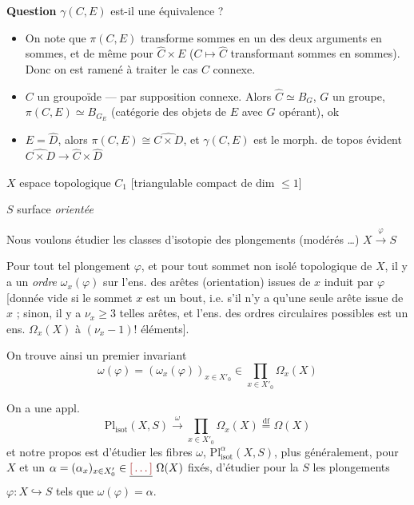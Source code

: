 \documentclass[11pt,a4paper]{article}
\begin{document}
\textbf{Question} $\gamma(C, E)$ est-il  une équivalence ?

\begin{itemize}
  \item[a)]   On note que $\pi(C, E)$
  transforme sommes en un des deux arguments en sommes, et de même pour
  $\hat{C} \times E$ ($C \mapsto \hat{C}$ transformant sommes en sommes).
  Donc on est ramené à traiter le cas $C$ connexe.
  \item[b)] $C$ un groupoïde ---  par supposition connexe.
  Alors $\hat{C} \simeq B_G$, $G$ un groupe, $\pi(C, E) \simeq B_{G_E}$
  (catégorie des objets de $E$ avec $G$ opérant), ok
  \item[c)] $E = \hat{D}$, alors $\pi(C, E) \cong \widehat{C \times D}$, et
  $\gamma(C, E)$ est le morph. de topos  évident
  $\widehat{C \times D} \to \hat{C} \times \hat{D}$
\end{itemize}


$X$ espace topologique  $C_1$ [triangulable compact de
dim $\leq 1$]

$S$ surface \emph{orientée}

Nous voulons étudier les classes d'isotopie des plongements (modérés …)
$X \xrightarrow{\varphi} S$

Pour tout tel plongement $\varphi$, et pour tout sommet 
non isolé topologique de $X$, il y a un \emph{ordre}
 $\omega_x(\varphi)$ sur l'ens. des arêtes
(orientation) issues de $x$ induit par $\varphi$  [donnée vide si
le sommet $x$ est un bout, i.e. s'il n'y a qu'une seule arête issue de $x$ ;
sinon, il y \struck{\ill{}} a $\nu_x \geq 3$ telles arêtes, et \struck{\ill{}}
l'ens. des ordres circulaires possibles est un ens.
$\Omega_x(X)$ à $(\nu_x - 1)!$ éléments].

On trouve ainsi un premier invariant
\[
\omega(\varphi) = (\omega_x(\varphi))_{x \in X'_0} \in \prod_{x \in X'_0} \Omega_x(X)
\]

On a une appl.
\[
\mathrm{Pl}_{\mathrm{isot}}(X, S) \xrightarrow{\ \omega\ } \prod_{x \in X'_0} \Omega_x(X)
\overset{\mathrm{df}}{=} \Omega(X)
\]
et notre propos est d'étudier les fibres  $\omega$,
$\mathrm{Pl}^{\alpha}_{\mathrm{isot}}(X, S)$, plus généralement, pour $X$ et
un $\alpha = (\alpha_x)_{x \in X'_0} \in \struck{\ill{}}\ \Omega(X)$ fixés,
d'étudier pour la $S$ les plongements $\varphi : X \hookrightarrow S$ tels que
$\omega(\varphi) = \alpha$.
\end{document}

